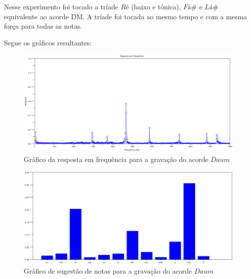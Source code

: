 Nesse experimento foi tocado a tríade $Ré$ (baixo e tônica), $Fá\#$ e $Lá\#$ equivalente ao acorde DM. A tríade foi tocada ao mesmo tempo e com a mesma força para todas as notas.

Segue os gráficos resultantes:

\begin{figure}[h]
	\centering
		\includegraphics[keepaspectratio=true,scale=0.49]{figuras/Dm/fft_Daum.eps}
	\caption{Gráfico da resposta em frequência para a gravação do acorde $Daum$}
\end{figure}

\begin{figure}[h]
	\centering
		\includegraphics[keepaspectratio=true,scale=0.49]{figuras/Dm/notas_Daum.eps}
	\caption{Gráfico de sugestão de notas para a gravação do acorde $Daum$}
\end{figure}

